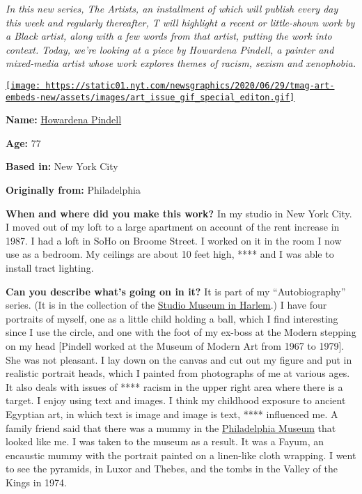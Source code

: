 \emph{In this new series, The Artists, an installment of which will
publish every day this week and regularly thereafter, T will highlight a
recent or little-shown work by a Black artist, along with a few words
from that artist, putting the work into context. Today, we're looking at
a piece by Howardena Pindell, a painter and mixed-media artist whose
work explores themes of racism, sexism and xenophobia.}

\href{https://www.nytimes.com/issue/t-magazine/2020/07/02/true-believers-art-issue}{\texttt{[image: https://static01.nyt.com/newsgraphics/2020/06/29/tmag-art-embeds-new/assets/images/art\_issue\_gif\_special\_editon.gif]}}

\textbf{Name:} \href{https://www.howardenapindell.org/}{Howardena
Pindell}

\textbf{Age:} 77

\textbf{Based in:} New York City

\textbf{Originally from:} Philadelphia

\textbf{When and where did you make this work?} In my studio in New York
City. I moved out of my loft to a large apartment on account of the rent
increase in 1987. I had a loft in SoHo on Broome Street. I worked on it
in the room I now use as a bedroom. My ceilings are about 10 feet high,
**** and I was able to install tract lighting.

\textbf{Can you describe what's going on in it?} It is part of my
``Autobiography'' series. (It is in the collection of the
\href{https://www.nytimes.com/topic/organization/studio-museum-in-harlem}{Studio
Museum in Harlem}.) I have four portraits of myself, one as a little
child holding a ball, which I find interesting since I use the circle,
and one with the foot of my ex-boss at the Modern stepping on my head
{[}Pindell worked at the Museum of Modern Art from 1967 to 1979{]}. She
was not pleasant. I lay down on the canvas and cut out my figure and put
in realistic portrait heads, which I painted from photographs of me at
various ages. It also deals with issues of **** racism in the upper
right area where there is a target. I enjoy using text and images. I
think my childhood exposure to ancient Egyptian art, in which text is
image and image is text, **** influenced me. A family friend said that
there was a mummy in the
\href{https://www.nytimes.com/topic/organization/philadelphia-museum-of-art}{Philadelphia
Museum} that looked like me. I was taken to the museum as a result. It
was a Fayum, an encaustic mummy with the portrait painted on a
linen-like cloth wrapping. I went to see the pyramids, in Luxor and
Thebes, and the tombs in the Valley of the Kings in 1974.

